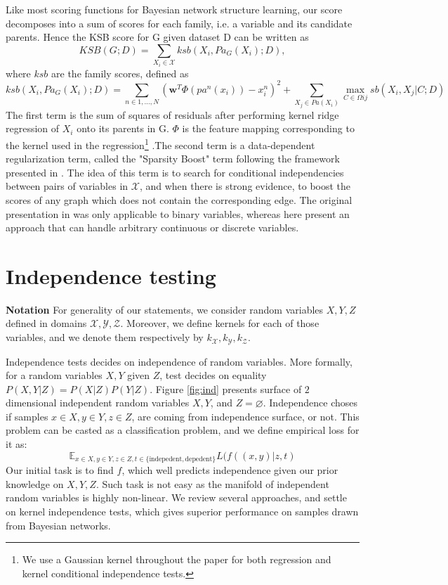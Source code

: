 \documentclass{article} %
\begin{document}
Like most scoring functions for Bayesian network structure learning, our score decomposes into a sum of scores for each family, i.e. a variable and its candidate parents.  Hence the KSB score for G given dataset D can be written as \begin{equation} KSB(G;D) = \sum_{X_i \in \mathcal{X}} ksb(X_i, Pa_G(X_i); D), \end{equation} where $ksb$ are the family scores, defined as \begin{equation} ksb(X_i, Pa_G(X_i); D) = \sum_{n \in 1, \ldots, N} \left(\mathbf{w}^T\Phi(pa^n(x_i)) - x_i^n \right)^2 + \sum_{X_j \in Pa(X_i)} \max_{C \in \Omega{ij}} sb(X_i, X_j|C; D) \end{equation}  The first term is the sum of squares of residuals after performing kernel ridge regression of $X_i$ onto its parents in G.  $\Phi$ is the feature mapping corresponding to the kernel used in the regression\footnote{We use a Gaussian kernel throughout the paper for both regression and kernel conditional independence tests.} .The second term is a data-dependent regularization term, called the "Sparsity Boost" term following the framework presented in \cite{brenner2013sparsityboost}.  The idea of this term is to search for conditional independencies between pairs of variables in $\mathcal{X}$, and when there is strong evidence, to boost the scores of any graph which does not contain the corresponding edge.  The original presentation in \cite{brenner2013sparsityboost} was only applicable to binary variables, whereas here present an approach that can handle arbitrary continuous or discrete variables. 

\section{Independence testing} 
{\bf Notation} 
For generality of our statements, we consider random variables $X, Y, Z$ defined in domains $\mathcal{X}, \mathcal{Y}, \mathcal{Z}$. Moreover,
we define kernels for each of those variables, and we denote them respectively by $k_{\mathcal{X}}, k_{\mathcal{Y}}, k_{\mathcal{Z}}$.


Independence tests decides on independence of random variables. More formally,
for a random variables $X, Y$ given $Z$, test decides on equality $P(X, Y| Z) = P(X | Z) P(Y | Z)$. 
Figure \ref{fig:ind} presents surface of $2$ dimensional independent 
random variables $X, Y$, and $Z = \varnothing$. Independence choses if samples $x \in X, y \in Y, z \in Z$, 
are coming from independence surface, or not. 
This problem can be casted as a classification problem, and we define
empirical loss for it as:
\begin{equation}
  \mathbb{E}_{x \in X, y \in Y, z \in Z, t \in \{\text{indepedent}, \text{depedent}\}} L(f((x, y)|z, t)
\end{equation}
Our initial task is to find $f$, which well predicts independence given our prior
knowledge on $X, Y, Z$. Such task is not easy as the manifold of independent
random variables is highly non-linear. We review several approaches, and 
settle on kernel independence tests, which gives superior performance on
samples drawn from Bayesian networks.
\end{document}
